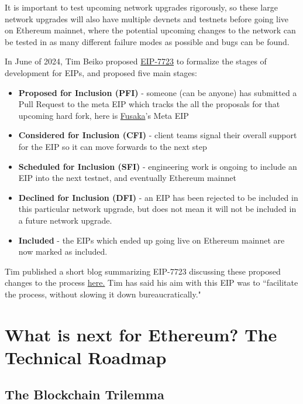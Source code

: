 \documentclass[12pt]{article}
\begin{document}
It is important to test upcoming network upgrades rigorously, so these large network upgrades will also have multiple devnets and testnets before going live on Ethereum mainnet, where the potential upcoming changes to the network can be tested in as many different failure modes as possible and bugs can be found. 

In June of 2024, Tim Beiko proposed  \href{https://eips.ethereum.org/EIPS/eip-7723}{EIP-7723} to formalize the stages of development for EIPs, and proposed five main stages: 

\begin{itemize}
    \item \textbf{Proposed for Inclusion (PFI)} - someone (can be anyone) has submitted a Pull Request to the meta EIP which tracks the all the proposals for that upcoming hard fork, here is \href{https://eips.ethereum.org/EIPS/eip-7607}{Fusaka}'s Meta EIP
    \item \textbf{Considered for Inclusion (CFI)} - client teams signal their overall support for the EIP so it can move forwards to the next step
    \item \textbf{Scheduled for Inclusion (SFI)} - engineering work is ongoing to include an EIP into the next testnet, and eventually Ethereum mainnet
    \item \textbf{Declined for Inclusion (DFI)} - an EIP has been rejected to be included in this particular network upgrade, but does not mean it will not be included in a future network upgrade. 
    \item \textbf{Included} - the EIPs which ended up going live on Ethereum mainnet are now marked as included. 
\end{itemize}

Tim published a short blog summarizing EIP-7723 discussing these proposed changes to the process \href{https://tim.mirror.xyz/CuRtFjkujKBqVsdvCGvthiPIYaZyzNc5sWIaExw2UpE}{here.} Tim has said his aim with this EIP was to ``facilitate the process, without slowing it down bureaucratically." 

\section{What is next for Ethereum? The Technical Roadmap}

\subsection[\protect\textbf{\small The Blockchain Trilemma}]{The Blockchain Trilemma}
\end{document}
